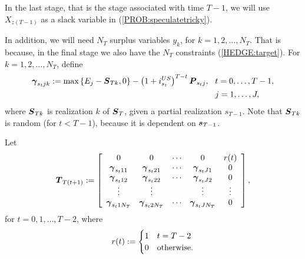 In the last stage, that is the stage associated with time $T-1$, we will use $X_{z(T-1)}$ as a slack variable in (\ref{PROB:speculatetricky}).

In addition, we will need $N_T$ surplus variables $y_k$, for $k=1, 2, \ldots, N_T$.  That is because, in the final stage we also have the $N_T$ constraints (\ref{HEDGE:target}).  For $k=1, 2, \ldots, N_T$, define
\[
\begin{split}
\mathbf{\boldsymbol{\gamma}}_{s_t j k}:= \text{max}\left\{E_j - \mathbf{\boldsymbol{S}}_{Tk},0\right\}-\left(1+i_{s_t}^{US}\right)^{T-t}\mathbf{\boldsymbol{P}}_{s_t j}, \hspace{3mm} &t=0,\ldots,T-1,\\
&j=1,\ldots,J,
\end{split}
\]
where $\mathbf{\boldsymbol{S}}_{Tk}$ is realization $k$ of $\mathbf{\boldsymbol{S}}_T$, given a partial realization $s_{T-1}$.  Note that $\mathbf{\boldsymbol{S}}_{Tk}$ is random (for $t<T-1$), because it is dependent on $\mathbf{\boldsymbol{s}}_{T-1}$.

Let
\[
\mathbf{\boldsymbol{T}}_{T(t+1)}:= \left[\begin{array}{ccccc}
0 & 0 & \cdots  & 0 & r(t)\\
\mathbf{\boldsymbol{\gamma}}_{s_t 1 1} & \mathbf{\boldsymbol{\gamma}}_{s_t 2 1} & \cdots & \mathbf{\boldsymbol{\gamma}}_{s_t J 1} & 0\\
\mathbf{\boldsymbol{\gamma}}_{s_t 1 2} & \mathbf{\boldsymbol{\gamma}}_{s_t 2 2} & \cdots & \mathbf{\boldsymbol{\gamma}}_{s_t J 2} & 0\\
\vdots & \vdots & & \vdots & \vdots\\
\mathbf{\boldsymbol{\gamma}}_{s_t 1 N_T} & \mathbf{\boldsymbol{\gamma}}_{s_t 2 N_T} & \cdots & \mathbf{\boldsymbol{\gamma}}_{s_t J N_T} & 0\end{array}\right],
\]
for $t=0, 1, \ldots, T-2$, where
\[
r(t) := \begin{cases} 1 & t=T-2\\
0 & \text{otherwise.}
\end{cases}
\]

